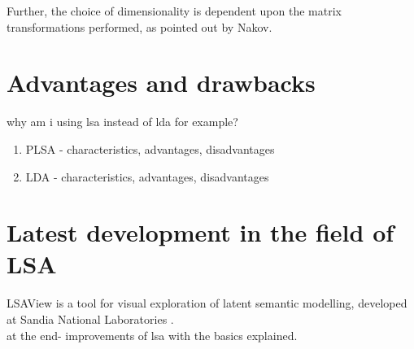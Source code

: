 Further, the choice of dimensionality is dependent upon the matrix transformations performed, as pointed out by Nakov\cite{NakovBetterResultsLSI}.\\

\section{Advantages and drawbacks}

why am i using lsa instead of lda for example?\\

\begin{enumerate}
\item PLSA - characteristics, advantages, disadvantages
\item LDA - characteristics, advantages, disadvantages
\end{enumerate}

\section{Latest development in the field of LSA}
LSAView is a tool for visual exploration of latent semantic modelling, developed at Sandia National Laboratories \cite{CrDuSh09}.\\

at the end- improvements of lsa with the basics explained.\\
